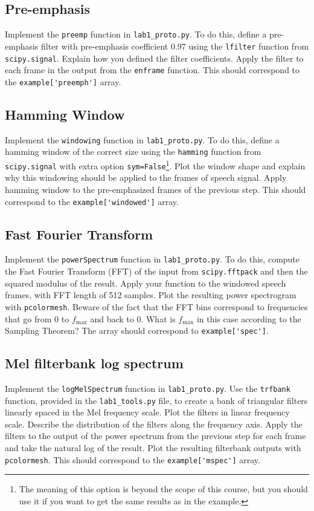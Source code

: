 \documentclass{nada-ten}
\begin{document}
\subsection{Pre-emphasis}
Implement the \texttt{preemp} function in \texttt{lab1\_proto.py}. To do this, define a pre-emphasis filter with pre-emphasis coefficient 0.97 using the \texttt{lfilter} function from \verb|scipy.signal|. Explain how you defined the filter coefficients. Apply the filter to each frame in the output from the \verb|enframe| function. This should correspond to the \verb|example['preemph']| array.

\subsection{Hamming Window}
Implement the \texttt{windowing} function in \texttt{lab1\_proto.py}. To do this, define a hamming window of the correct size using the \texttt{hamming} function from \verb|scipy.signal| with extra option \texttt{sym=False}\footnote{The meaning of this option is beyond the scope of this course, but you should use it if you want to get the same results as in the example.}. Plot the window shape and explain why this windowing should be applied to the frames of speech signal. Apply hamming window to the pre-emphasized frames of the previous step. This should correspond to the \verb|example['windowed']| array.

\subsection{Fast Fourier Transform}
Implement the \texttt{powerSpectrum} function in \texttt{lab1\_proto.py}. To do this, compute the Fast Fourier Transform (FFT) of the input from \verb|scipy.fftpack| and then the squared modulus of the result. Apply your function to the windowed speech frames, with FFT length of 512 samples. Plot the resulting power spectrogram with \texttt{pcolormesh}. Beware of the fact that the FFT bins correspond to frequencies that go from 0 to $f_{\mbox{max}}$ and back to 0. What is $f_{\mbox{max}}$ in this case according to the Sampling Theorem? The array should correspond to \verb|example['spec']|.
%

\subsection{Mel filterbank log spectrum}
Implement the \texttt{logMelSpectrum} function in \texttt{lab1\_proto.py}. Use the \verb|trfbank| function, provided in the \texttt{lab1\_tools.py} file, to create a bank of triangular filters linearly spaced in the Mel frequency scale. Plot the filters in linear frequency scale. Describe the distribution of the filters along the frequency axis. Apply the filters to the output of the power spectrum from the previous step for each frame and take the natural log of the result. Plot the resulting filterbank outputs with \texttt{pcolormesh}. This should correspond to the \verb|example['mspec']| array.
\end{document}
